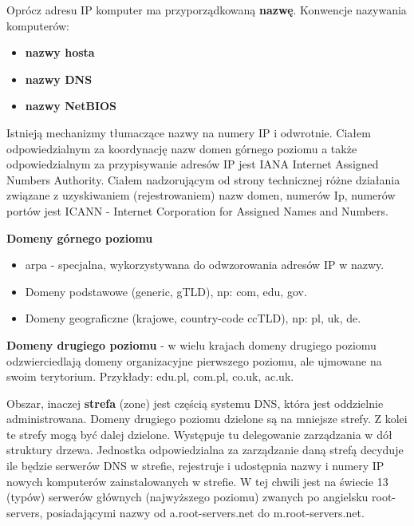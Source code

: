 \documentclass[../main.tex]{subfiles}
\begin{document}
        Oprócz adresu IP komputer ma
        przyporządkowaną \textbf{nazwę}. Konwencje nazywania komputerów:
        \begin{itemize}
            \item \textbf{nazwy hosta}
            \item \textbf{nazwy DNS}
            \item \textbf{nazwy NetBIOS}
        \end{itemize}

        Istnieją mechanizmy tłumaczące nazwy na numery IP i odwrotnie.
        Ciałem odpowiedzialnym za koordynację nazw domen górnego poziomu a także
        odpowiedzialnym za przypisywanie adresów IP jest IANA Internet Assigned Numbers
        Authority.
        Ciałem nadzorującym od strony technicznej różne działania związane z uzyskiwaniem
        (rejestrowaniem) nazw domen, numerów Ip, numerów portów jest ICANN - Internet
        Corporation for Assigned Names and Numbers.

        \textbf{Domeny górnego poziomu}
        \begin{itemize}
            \item arpa - specjalna, wykorzystywana do odwzorowania adresów IP w nazwy.
            \item Domeny podstawowe (generic, gTLD), np: com, edu, gov.
            \item Domeny geograficzne (krajowe, country-code ccTLD), np: pl, uk, de.
        \end{itemize}

        \textbf{Domeny drugiego poziomu} - w wielu krajach domeny drugiego poziomu odzwierciedlają
        domeny organizacyjne pierwszego poziomu, ale ujmowane na swoim terytorium. Przykłady:
        edu.pl, com.pl, co.uk, ac.uk.

        Obszar, inaczej \textbf{strefa} (zone) jest częścią systemu DNS, która jest oddzielnie administrowana.
        Domeny drugiego poziomu dzielone są na mniejsze strefy. Z kolei te strefy mogą być dalej
        dzielone. Występuje tu delegowanie zarządzania w dół struktury drzewa. Jednostka
        odpowiedzialna za zarządzanie daną strefą decyduje ile będzie serwerów DNS w strefie,
        rejestruje i udostępnia nazwy i numery IP nowych komputerów zainstalowanych w strefie.
        W tej chwili jest na świecie 13 (typów) serwerów głównych (najwyższego poziomu) zwanych
        po angielsku root-servers, posiadającymi nazwy od a.root-servers.net do m.root-servers.net.
\end{document}
